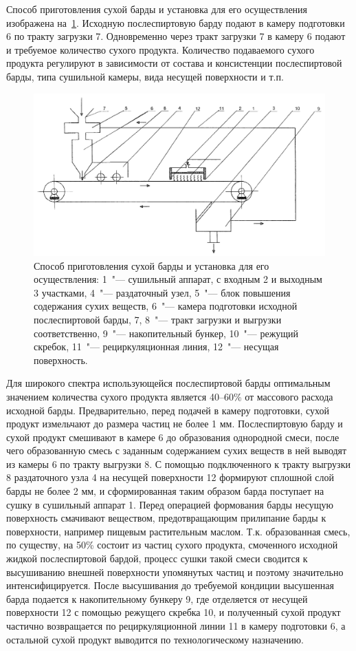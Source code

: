 Способ приготовления сухой барды и установка для его осуществления~\cite{Ezhkov.Sposob.2005} изображена на~\cref{fig:stillage_ezhkov}.
Исходную послеспиртовую барду подают в камеру подготовки 6 по тракту загрузки 7.
Одновременно через тракт загрузки 7 в камеру 6 подают и требуемое количество сухого продукта.
Количество подаваемого сухого продукта регулируют в зависимости от состава и консистенции послеспиртовой барды, типа сушильной камеры, вида несущей поверхности и т.п.
\begin{figure}[htb]
\centering
\includegraphics[width=\textwidth]{figures/temp/ezhkov.jpg}
\caption[Способ приготовления сухой барды и установка для его осуществления]{Способ приготовления сухой барды и установка для его осуществления: 1~"--- сушильный аппарат, с входным 2 и выходным 3 участками, 4~"--- раздаточный узел, 5~"--- блок повышения содержания сухих веществ, 6~"--- камера подготовки исходной послеспиртовой барды, 7, 8~"--- тракт загрузки и выгрузки соответственно, 9~"--- накопительный бункер, 10~"--- режущий скребок, 11~"--- рециркуляционная линия, 12~"--- несущая поверхность.}\label{fig:stillage_ezhkov}
\end{figure}
Для широкого спектра использующейся послеспиртовой барды оптимальным значением количества сухого продукта является 40--60\% от массового расхода исходной барды.
Предварительно, перед подачей в камеру подготовки, сухой продукт измельчают до размера частиц не более 1 мм.
Послеспиртовую барду и сухой продукт смешивают в камере 6 до образования однородной смеси, после чего образованную смесь с заданным содержанием сухих веществ в ней выводят из камеры 6 по тракту выгрузки 8.
С помощью подключенного к тракту выгрузки 8 раздаточного узла 4 на несущей поверхности 12 формируют сплошной слой барды не более 2 мм, и сформированная таким образом барда поступает на сушку в сушильный аппарат 1.
Перед операцией формования барды несущую поверхность смачивают веществом, предотвращающим прилипание барды к поверхности, например пищевым растительным маслом.
Т.к. образованная смесь, по существу, на 50\% состоит из частиц сухого продукта, смоченного исходной жидкой послеспиртовой бардой, процесс сушки такой смеси сводится к высушиванию внешней поверхности упомянутых частиц и поэтому значительно интенсифицируется.
После высушивания до требуемой кондиции высушенная барда подается к накопительному бункеру 9, где отделяется от несущей поверхности 12 с помощью режущего скребка 10, и полученный сухой продукт частично возвращается по рециркуляционной линии 11 в камеру подготовки 6, а остальной сухой продукт выводится по технологическому назначению.

